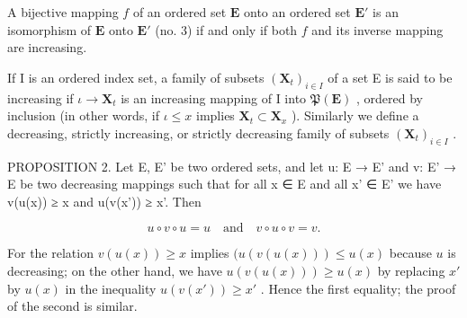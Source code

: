 A bijective mapping \(f\) of an ordered set \(\mathbf{E}\) onto an ordered set \(\mathbf{E}'\) is an isomorphism of \(\mathbf{E}\) onto \(\mathbf{E}'\) (no. 3) if and only if both \(f\) and its inverse mapping are increasing.

If I is an ordered index set, a family of subsets \((\mathbf{X}_t)_{i \in I}\) of a set E is said to be increasing if \(\iota \to \mathbf{X}_t\) is an increasing mapping of I into \(\mathfrak{P}(\mathbf{E})\) , ordered by inclusion (in other words, if \(\iota \leqslant x\) implies \(\mathbf{X}_t \subset \mathbf{X}_x\) ). Similarly we define a decreasing, strictly increasing, or strictly decreasing family of subsets \((\mathbf{X}_t)_{i \in I}\) .

PROPOSITION 2. Let E, E' be two ordered sets, and let u: E → E' and v: E' → E be two decreasing mappings such that for all x ∈ E and all x' ∈ E' we have v(u(x)) ≥ x and u(v(x')) ≥ x'. Then

\[
u \circ v \circ u = u \quad \text{and} \quad v \circ u \circ v = v.
\]

For the relation \(v(u(x)) \geqslant x\) implies \((u(v(u(x))) \leqslant u(x)\) because \(u\) is decreasing; on the other hand, we have \(u(v(u(x))) \geqslant u(x)\) by replacing \(x'\) by \(u(x)\) in the inequality \(u(v(x')) \geqslant x'\) . Hence the first equality; the proof of the second is similar.

